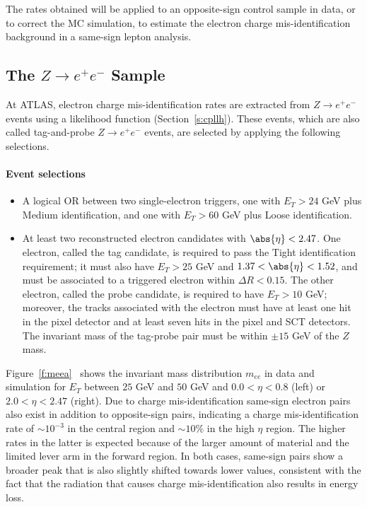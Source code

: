 The rates obtained will be applied to an opposite-sign control sample in data,
or to correct the MC simulation, to estimate the electron charge
mis-identification background in a same-sign lepton analysis.

\subsection{The $Z\to e^+e^-$ Sample}\label{s:zeerates}

At ATLAS, electron charge mis-identification rates are extracted from $Z\to
	e^+e^-$ events using a likelihood function (Section~\ref{s:cpllh}). These
events, which are also called tag-and-probe $Z\to e^+e^-$ events, are selected
by applying the following selections.

\paragraph{Event selections}

\begin{itemize}

	\item A logical OR between two single-electron triggers, one with $E_T > 24$
	      GeV plus Medium identification, and one with $E_T > 60$ GeV plus Loose
	      identification.

	\item At least two reconstructed electron candidates with $\abs{\eta} < 2.47$.
	      One electron, called the tag candidate, is required to pass the Tight
	      identification requirement; it must also have $E_T > 25$ GeV and $1.37 <
		      \abs{\eta} < 1.52$, and must be associated to a triggered electron within
	      $\Delta R < 0.15$. The other electron, called the probe candidate, is required
	      to have $E_T > 10$ GeV; moreover, the tracks associated with the electron must
	      have at least one hit in the pixel detector and at least seven hits in the
	      pixel and SCT detectors. The invariant mass of the tag-probe pair must be
	      within $\pm 15$ GeV of the $Z$ mass.

\end{itemize}

Figure~\ref{f:meea}~\cite{atlaselcid} shows the invariant mass distribution
$m_{ee}$ in data and simulation for $E_T$ between $25$ GeV and $50$ GeV and
$0.0 < \eta < 0.8$ (left) or $2.0 < \eta < 2.47$ (right). Due to charge
mis-identification same-sign electron pairs also exist in addition to
opposite-sign pairs, indicating a charge mis-identification rate of $\sim
10^{-3}$ in the central region and $\sim 10\%$ in the high $\eta$ region. The
higher rates in the latter is expected because of the larger amount of material
and the limited lever arm in the forward region. In both cases, same-sign pairs
show a broader peak that is also slightly shifted towards lower values,
consistent with the fact that the radiation that causes charge
mis-identification also results in energy loss.


